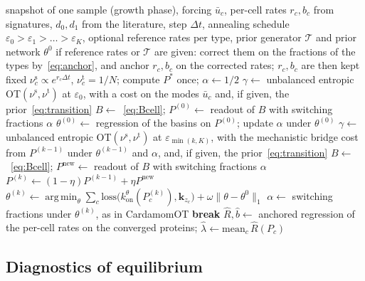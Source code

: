 \documentclass[a4paper, 11pt]{article}
\DeclareMathOperator*{\argmin}{arg\,min}
\newcommand{\kon}{k_{\mathrm{on}}^{\theta}}
\newcommand{\Tg}{\mathcal{T}}
\theoremstyle{plain}
\theoremstyle{remark}
\begin{document}
\begin{algorithm}[H]
\caption{CardamomOT-stat (sketch)}\label{alg:stat}
\begin{algorithmic}[1]
\Require snapshot of one sample (growth phase), forcing $\bar u_c$, per-cell rates $r_c, b_c$ from signatures, $d_0, d_1$ from the literature, step $\Delta t$, annealing schedule $\varepsilon_0 > \varepsilon_1 > \dots > \varepsilon_K$, optional reference rates per type, prior generator $\Tg$ and prior network $\theta^0$
\State if reference rates or $\Tg$ are given: correct them on the fractions of the types by~\eqref{eq:anchor}, and anchor $r_c, b_c$ on the corrected rates; $r_c, b_c$ are then kept fixed
\State $\nu^{\mathrm{s}}_c \propto e^{r_c\Delta t}$, $\nu^{\mathrm{t}}_c = 1/N$; compute $P^\ast$ once; $\alpha \gets 1/2$
\State $\gamma \gets$ unbalanced entropic OT$(\nu^{\mathrm{s}}, \nu^{\mathrm{t}})$ at $\varepsilon_0$, with a cost on the modes $\bar u_c$ and, if given, the prior~\eqref{eq:transition}
\State $B \gets$~\eqref{eq:Bcell}; $P^{(0)} \gets$ readout of $B$ with switching fractions $\alpha$
\State $\theta^{(0)} \gets$ regression of the basins on $P^{(0)}$; update $\alpha$ under $\theta^{(0)}$
  \State $\gamma \gets$ unbalanced entropic OT$(\nu^{\mathrm{s}}, \nu^{\mathrm{t}})$ at $\varepsilon_{\min(k,K)}$, with the mechanistic bridge cost from $P^{(k-1)}$ under $\theta^{(k-1)}$ and $\alpha$, and, if given, the prior~\eqref{eq:transition}
  \State $B \gets$~\eqref{eq:Bcell}; $P^{\mathrm{new}} \gets$ readout of $B$ with switching fractions $\alpha$
  \State $P^{(k)} \gets (1-\eta)P^{(k-1)} + \eta P^{\mathrm{new}}$
  \State $\theta^{(k)} \gets \argmin_\theta \sum_c \mathrm{loss}\bigl(\kon(P^{(k)}_c), \mathbf{k}_{z_c}\bigr) + \omega\|\theta - \theta^0\|_1$
  \State $\alpha \gets$ switching fractions under $\theta^{(k)}$, as in CardamomOT
   \textbf{break} \EndIf
\EndFor
\State $\hat R, \hat b \gets$ anchored regression of the per-cell rates on the converged proteins; $\hat\lambda \gets \mathrm{mean}_c\,\hat R(P_c)$
\end{algorithmic}
\end{algorithm}

\subsection{Diagnostics of equilibrium}\label{sec:diag}
\end{document}
